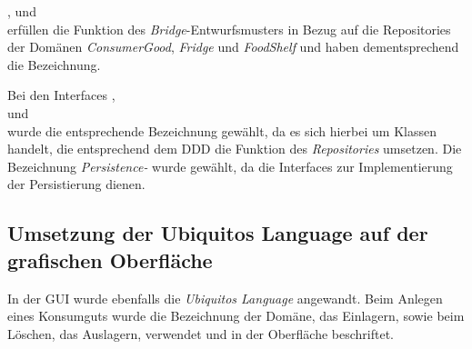 \href{https://github.com/lucasmerkel/dhbw-advancedswe-programmentwurf/blob/5764d7da4cfd0562ed8e96128e92f85c30b7309d/swe_programmentwurf/consumergoods-inventory-planner/0-cip-plugins/src/main/java/de/dhbw/cip/plugins/persistence/hibernate/ConsumerGoodsRepositoryBridge.java}{}, \href{https://github.com/lucasmerkel/dhbw-advancedswe-programmentwurf/blob/5764d7da4cfd0562ed8e96128e92f85c30b7309d/swe_programmentwurf/consumergoods-inventory-planner/0-cip-plugins/src/main/java/de/dhbw/cip/plugins/persistence/hibernate/FoodShelfRepositoryBridge.java}{} und \\\href{https://github.com/lucasmerkel/dhbw-advancedswe-programmentwurf/blob/5764d7da4cfd0562ed8e96128e92f85c30b7309d/swe_programmentwurf/consumergoods-inventory-planner/0-cip-plugins/src/main/java/de/dhbw/cip/plugins/persistence/hibernate/FridgeRepositoryBridge.java}{} erfüllen die Funktion des \textit{Bridge}-Entwurfsmusters in Bezug auf die Repositories der Domänen \textit{ConsumerGood}, \textit{Fridge} und \textit{FoodShelf} und haben dementsprechend die Bezeichnung.

Bei den Interfaces \href{https://github.com/lucasmerkel/dhbw-advancedswe-programmentwurf/blob/5764d7da4cfd0562ed8e96128e92f85c30b7309d/swe_programmentwurf/consumergoods-inventory-planner/0-cip-plugins/src/main/java/de/dhbw/cip/plugins/persistence/hibernate/PersistenceConsumerGoodsRepository.java}{}, \\\href{https://github.com/lucasmerkel/dhbw-advancedswe-programmentwurf/blob/5764d7da4cfd0562ed8e96128e92f85c30b7309d/swe_programmentwurf/consumergoods-inventory-planner/0-cip-plugins/src/main/java/de/dhbw/cip/plugins/persistence/hibernate/PersistenceFridgeRepository.java}{} und \\\href{https://github.com/lucasmerkel/dhbw-advancedswe-programmentwurf/blob/5764d7da4cfd0562ed8e96128e92f85c30b7309d/swe_programmentwurf/consumergoods-inventory-planner/0-cip-plugins/src/main/java/de/dhbw/cip/plugins/persistence/hibernate/PersistenceFoodShelfRepository.java}{} wurde die entsprechende Bezeichnung gewählt, da es sich hierbei um Klassen handelt, die entsprechend dem \ac{DDD} die Funktion des \textit{Repositories} umsetzen.
Die Bezeichnung \textit{Persistence-} wurde gewählt, da die Interfaces zur Implementierung der Persistierung dienen.

\subsection*{Umsetzung der Ubiquitos Language auf der grafischen Oberfläche}
In der \ac{GUI} wurde ebenfalls die \textit{Ubiquitos Language} angewandt.
Beim Anlegen eines Konsumguts wurde die Bezeichnung der Domäne, das Einlagern, sowie beim Löschen, das Auslagern, verwendet und in der Oberfläche beschriftet.

